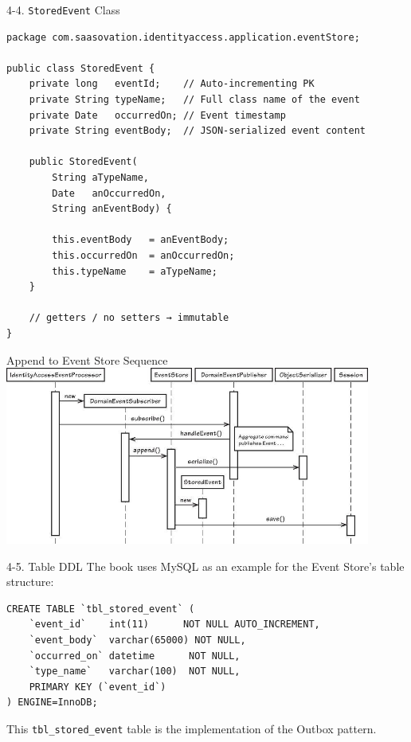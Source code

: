 \documentclass{beamer}
\begin{document}
\begin{frame}[fragile]{4-4. \texttt{StoredEvent} Class}
  \lstset{language=Java, basicstyle=\ttfamily\scriptsize}
  \begin{lstlisting}
package com.saasovation.identityaccess.application.eventStore;

public class StoredEvent {
    private long   eventId;    // Auto-incrementing PK
    private String typeName;   // Full class name of the event
    private Date   occurredOn; // Event timestamp
    private String eventBody;  // JSON-serialized event content

    public StoredEvent(
        String aTypeName,
        Date   anOccurredOn,
        String anEventBody) {

        this.eventBody   = anEventBody;
        this.occurredOn  = anOccurredOn;
        this.typeName    = aTypeName;
    }

    // getters / no setters → immutable
}
  \end{lstlisting}
\end{frame}

\begin{frame}{Append to Event Store Sequence}
  \includegraphics[width=0.9\textwidth]{img/DomainEvent_AppendToEventStore_SequenceDiagram.png}
\end{frame}

\begin{frame}[fragile]{4-5. Table DDL}
  The book uses MySQL as an example for the Event Store's table structure:
  \lstset{language=SQL, basicstyle=\ttfamily\scriptsize}
  \begin{lstlisting}
CREATE TABLE `tbl_stored_event` (
    `event_id`    int(11)      NOT NULL AUTO_INCREMENT,
    `event_body`  varchar(65000) NOT NULL,
    `occurred_on` datetime      NOT NULL,
    `type_name`   varchar(100)  NOT NULL,
    PRIMARY KEY (`event_id`)
) ENGINE=InnoDB;
  \end{lstlisting}
  This \texttt{tbl\_stored\_event} table is the implementation of the Outbox pattern.
\end{frame}
\end{document}
